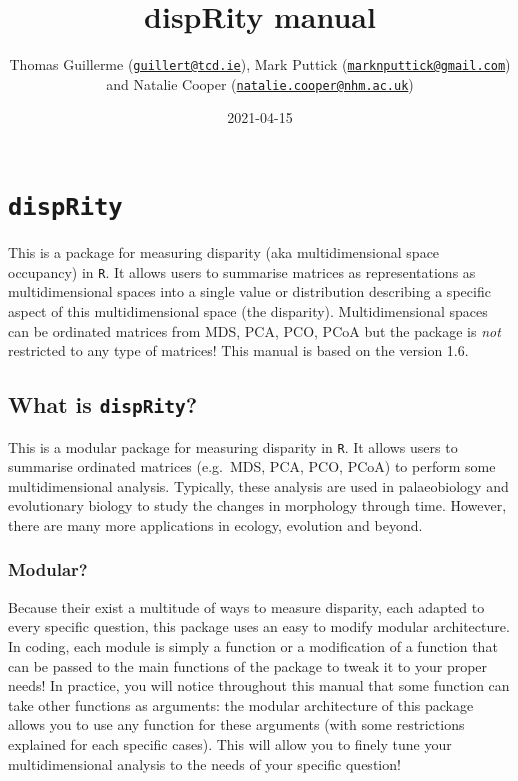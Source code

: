\documentclass[]{book}
\title{dispRity manual}
\author{Thomas Guillerme (\href{mailto:guillert@tcd.ie}{\nolinkurl{guillert@tcd.ie}}),
Mark Puttick (\href{mailto:marknputtick@gmail.com}{\nolinkurl{marknputtick@gmail.com}}) and
Natalie Cooper (\href{mailto:natalie.cooper@nhm.ac.uk}{\nolinkurl{natalie.cooper@nhm.ac.uk}})}
\date{2021-04-15}
\begin{document}
\maketitle

{
\setcounter{tocdepth}{1}
\tableofcontents
}
\hypertarget{disprity}{%
\chapter{\texorpdfstring{\texttt{dispRity}}{dispRity}}\label{disprity}}

This is a package for measuring disparity (aka multidimensional space occupancy) in \texttt{R}.
It allows users to summarise matrices as representations as multidimensional spaces into a single value or distribution describing a specific aspect of this multidimensional space (the disparity).
Multidimensional spaces can be ordinated matrices from MDS, PCA, PCO, PCoA but the package is \emph{not} restricted to any type of matrices!
This manual is based on the version 1.6.

\hypertarget{what-is-disprity}{%
\section{\texorpdfstring{What is \texttt{dispRity}?}{What is dispRity?}}\label{what-is-disprity}}

This is a modular package for measuring disparity in \texttt{R}.
It allows users to summarise ordinated matrices (e.g.~MDS, PCA, PCO, PCoA) to perform some multidimensional analysis.
Typically, these analysis are used in palaeobiology and evolutionary biology to study the changes in morphology through time.
However, there are many more applications in ecology, evolution and beyond.

\hypertarget{modular}{%
\subsection{Modular?}\label{modular}}

Because their exist a multitude of ways to measure disparity, each adapted to every specific question, this package uses an easy to modify modular architecture.
In coding, each module is simply a function or a modification of a function that can be passed to the main functions of the package to tweak it to your proper needs!
In practice, you will notice throughout this manual that some function can take other functions as arguments: the modular architecture of this package allows you to use any function for these arguments (with some restrictions explained for each specific cases).
This will allow you to finely tune your multidimensional analysis to the needs of your specific question!
\end{document}
